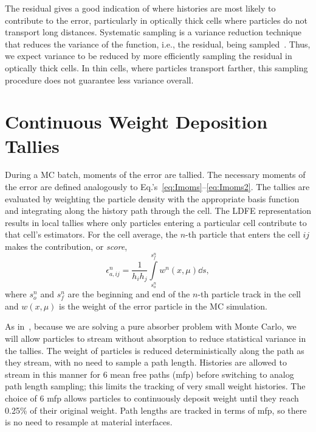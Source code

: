 The residual gives a good indication of where
histories are most likely to contribute to the error, particularly in optically
thick cells where particles do not transport long distances. Systematic sampling is a
variance reduction technique that reduces the variance of the function, i.e., the residual, being sampled~\cite{shultis_mc}.  Thus, we expect
variance to be reduced by more efficiently sampling the residual in optically thick cells.  In thin
cells, where particles transport farther, this sampling procedure does not guarantee less variance
overall. 



\section{Continuous Weight Deposition Tallies}
\label{sec:tallies}

During a MC batch, moments of the error are tallied.  The necessary moments of the error are
defined analogously to Eq.'s~\eqref{eq:Imoms}--\eqref{eq:Imoms2}.  
The tallies are evaluated by weighting the particle density with the appropriate
basis function and integrating along the history path through the cell.  The LDFE
representation results in local tallies where only particles entering a particular cell
contribute to that cell's estimators.  For the cell average, the $n$-th
particle that enters the cell $ij$ makes the contribution, or \emph{score},
\begin{equation}\label{eq:avg_tal}
   \epsilon^n_{a,ij} = \frac{1}{h_ih_j} \int\limits_{s^n_o}^{s^n_f}  w^n(x,\mu) \dd s,
\end{equation}
where $s_o^n$ and $s_f^n$ are the beginning and end of the $n$-th particle track in the cell and $w(x,\mu)$ is
the weight of the error particle in the MC simulation. 

As in~\cite{park}, because we are solving a pure absorber problem with Monte Carlo, we will allow
particles to stream without absorption to reduce statistical 
variance in the tallies.  The weight of particles is reduced deterministically along
the path as they stream, with no need to sample a path length. Histories are allowed to stream in this manner for 6 mean free paths (mfp)
before switching to analog path length sampling; this limits the tracking of very small weight histories. The choice of 6 mfp allows particles to 
continuously deposit weight until they reach 0.25\% of their original weight.  Path lengths are tracked in terms of mfp, so there is no need to resample at material
interfaces.


